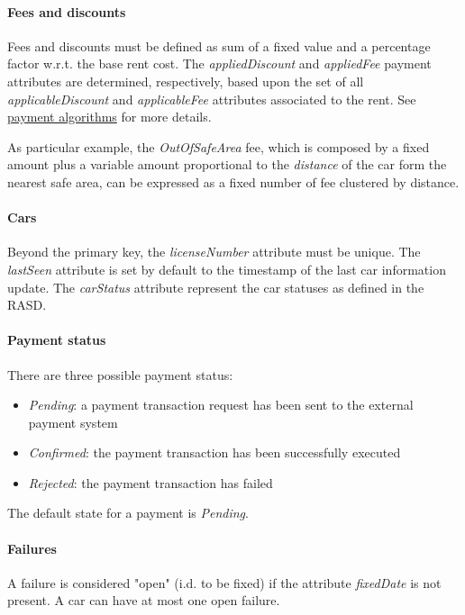 \paragraph{Fees and discounts}
Fees and discounts must be defined as sum of a fixed value and a percentage factor w.r.t. the base rent cost.
The \emph{appliedDiscount} and \emph{appliedFee} payment attributes are determined, respectively, based upon the set of all \emph{applicableDiscount} and \emph{applicableFee} attributes associated to the rent. See \hyperref[sec:paymentAlgorithms]{payment algorithms} for more details.

As particular example, the \emph{OutOfSafeArea} fee, which is composed by a fixed amount plus a variable amount proportional to the \emph{distance} of the car form the nearest safe area, can be expressed as a fixed number of fee clustered by distance.

\paragraph{Cars}Beyond the primary key, the \mbox{\emph{licenseNumber}} attribute must be unique. The \mbox{\emph{lastSeen}} attribute is set by default to the timestamp of the last car information update. The \mbox{\emph{carStatus}} attribute represent the car statuses as defined in the RASD.

\paragraph{Payment status} There are three possible payment status:
\begin{itemize}
	\item \emph{Pending}: a payment transaction request has been sent to the external payment system
	\item \emph{Confirmed}: the payment transaction has been successfully executed
	\item \emph{Rejected}: the payment transaction has failed
\end{itemize}
The default state for a payment is \emph{Pending}.

\paragraph{Failures}A failure is considered "open" (i.d. to be fixed) if the attribute \emph{fixedDate} is not present. A car can have at most one open failure.

